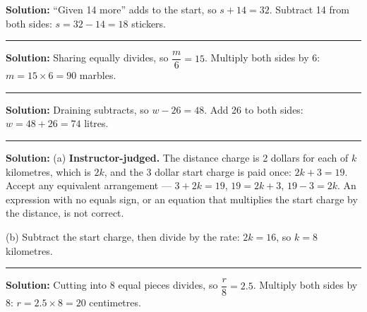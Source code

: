 \documentclass[12pt]{article}
\begin{document}



\textbf{Solution:} ``Given 14 more'' adds to the start, so
$s + 14 = 32$. Subtract 14 from both sides: $s = 32 - 14 = 18$
stickers. 

\vspace{0.25cm}\noindent\rule{\linewidth}{0.2pt}\vspace{0.25cm}


\textbf{Solution:} Sharing equally divides, so $\dfrac{m}{6} = 15$. Multiply
both sides by 6: $m = 15 \times 6 = 90$ marbles. 

\vspace{0.25cm}\noindent\rule{\linewidth}{0.2pt}\vspace{0.25cm}


\textbf{Solution:} Draining subtracts, so $w - 26 = 48$. Add 26 to both sides:
$w = 48 + 26 = 74$ litres. 

\vspace{0.25cm}\noindent\rule{\linewidth}{0.2pt}\vspace{0.25cm}


\textbf{Solution:} (a) \textbf{Instructor-judged.} The distance charge is 2
dollars for each of $k$ kilometres, which is $2k$, and the 3 dollar start charge
is paid once: $2k + 3 = 19$. Accept any equivalent arrangement --- $3 + 2k = 19$,
$19 = 2k + 3$, $19 - 3 = 2k$. An expression with no equals sign, or an equation
that multiplies the start charge by the distance, is not correct.

(b) Subtract the start charge, then divide by the rate:
$2k = 16$, so $k = 8$ kilometres. 

\vspace{0.25cm}\noindent\rule{\linewidth}{0.2pt}\vspace{0.25cm}


\textbf{Solution:} Cutting into 8 equal pieces divides, so
$\dfrac{r}{8} = 2.5$. Multiply both sides by 8:
$r = 2.5 \times 8 = 20$ centimetres. 
\end{document}
